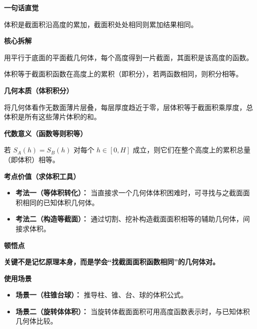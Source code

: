 \begin{explanationbox}
	\textbf{\textcolor{CExplanation}{一句话直觉}}

	体积是截面积沿高度的累加，截面积处处相同则累加结果相同。

	\medskip
	\textbf{\textcolor{CExplanation}{核心拆解}}
	\begin{description}[style=nextline, leftmargin=2.8em, labelsep=0.5em, itemsep=0.45em]
		\item[\textbf{要点一（平行截割）：}] 用平行于底面的平面截几何体，每个高度得到一片截面，其面积是该高度的函数。
		\item[\textbf{要点二（积分思想）：}] 体积等于截面积函数在高度上的累积（即积分），若两函数相同，则积分相等。
	\end{description}

	\medskip
	\textbf{\textcolor{CExplanation}{几何本质（体积积分）}}

	将几何体看作无数面薄片层叠，每层厚度趋近于零，层体积等于截面积乘厚度，总体积是所有这些薄片体积的和。

	\medskip
	\textbf{\textcolor{CExplanation}{代数意义（函数等则积等）}}

	若 $S_A(h)=S_B(h)$ 对每个 $h\in[0,H]$ 成立，则它们在整个高度上的累积总量（即体积）相等。

	\medskip
	\textbf{\textcolor{CExplanation}{考点价值（求体积工具）}}
	\begin{itemize}[leftmargin=*, itemsep=0.5em, topsep=0.4em]
		\item \textbf{考法一（等体积转化）：} 当直接求一个几何体体积困难时，可寻找与之截面面积相同的已知体积几何体。
		\item \textbf{考法二（构造等截面）：} 通过切割、挖补构造截面面积相等的辅助几何体，间接求体积。
	\end{itemize}

	\medskip
	\textbf{\textcolor{CExplanation}{顿悟点}}

	\textbf{关键不是记忆原理本身，而是学会“找截面面积函数相同”的几何体对。}

	\medskip
	\textbf{\textcolor{CExplanation}{使用场景}}
	\begin{itemize}[leftmargin=*, itemsep=0.5em, topsep=0.4em]
		\item \textbf{场景一（柱锥台球）：} 推导柱、锥、台、球的体积公式。
		\item \textbf{场景二（旋转体体积）：} 当旋转体截面面积可用高度函数表示时，与已知体积几何体比较。
	\end{itemize}
\end{explanationbox}

